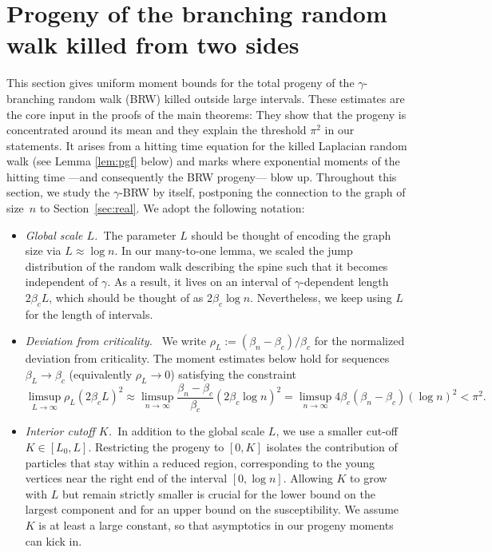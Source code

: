 \documentclass[a4paper, a4wide, 10pt, reqno]{amsart}
\theoremstyle{plain}
\theoremstyle{definition}
\numberwithin{equation}{section}
\begin{document}
\section{Progeny of the branching random walk killed from two sides}\label{sec:progeny}

This section gives uniform moment bounds for the total progeny of the $\gamma$-branching random walk (BRW) killed outside large intervals. These estimates are the core input in the proofs of the main theorems: They show that the progeny is concentrated around its mean and they explain the threshold $\pi^2$ in our statements. 
It arises from a hitting time equation for the killed Laplacian random walk (see Lemma \ref{lem:pgf} below) and marks where exponential moments of the hitting time ---and consequently the BRW progeny--- blow up.
Throughout this section, we 
study the $\gamma$-BRW by itself, postponing
the connection to the graph of size~$n$ to Section~\ref{sec:real}.
We adopt the following notation: 
\begin{itemize}[leftmargin=1em]
    \item[-] \emph{Global scale $L$.\ }The parameter $L$ should be thought of encoding the graph size via $L\approx\log n$. In our many-to-one lemma, 
    {we scaled the jump distribution of the random walk describing the spine such that it becomes independent of $\gamma$. As a result, it lives on an interval of $\gamma$-dependent length $2\beta_cL$, which should be thought of as $2\beta_c\log n$. Nevertheless, we keep using $L$ for the length of intervals.}%
    \smallskip
    \item[-] \emph{Deviation from criticality.\ } We write $\rho_L:=(\beta_n-\beta_c)/\beta_c$ for the normalized deviation from criticality. The moment estimates below hold for sequences $\beta_L\to\beta_c$  (equivalently $\rho_L\to0$) satisfying the constraint \[\limsup_{L\to\infty}\rho_L(2\beta_c L)^2\approx\limsup_{n\to\infty}\frac{\beta_n-\beta_c}{\beta_c}(2\beta_c\log n)^2=\limsup_{n\to\infty}4\beta_c(\beta_n-\beta_c)(\log n)^2<\pi^2.\]
    \item[-] \emph{Interior cutoff $K$.\ }In addition to the global scale $L$, we use a smaller cut-off $K\in[L_0, L]$. Restricting the progeny to $[0, K]$ isolates the contribution of particles that stay within a reduced region, corresponding to the young vertices near the right end of the interval $[0, \log n]$. Allowing $K$ to grow with $L$ but remain strictly smaller is crucial for the lower bound on the largest component and for an upper bound on the susceptibility.  We assume $K$ is at least a large constant, so that asymptotics in our progeny moments can kick in.
\end{itemize}   
\end{document}
